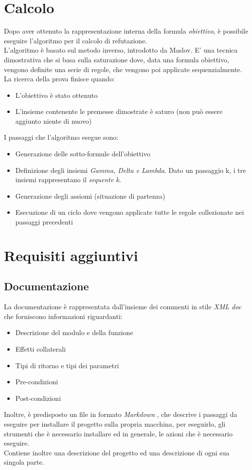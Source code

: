 \documentclass[\main/tesi.tex]{subfiles}
\begin{document}
\section{Calcolo}
Dopo aver ottenuto la rappresentazione interna della formula \textit{obiettivo}, è possibile eseguire l'algoritmo per il calcolo di refutazione. \\
L'algoritmo è basato sul metodo inverso, introdotto da Maslov. E' una tecnica dimostrativa che si basa sulla saturazione dove, data una formula obiettivo, vengono definite una serie di regole, che vengono poi applicate sequenzialmente. \\
La ricerca della prova finisce quando:
\begin{itemize}
    \item L'obiettivo è stato ottenuto
    \item L'insieme contenente le premesse dimostrate è saturo (non può essere aggiunto niente di nuovo)
\end{itemize}
I passaggi che l'algoritmo esegue sono:
\begin{itemize}
    \item Generazione delle sotto-formule dell'obiettivo
    \item Definizione degli insiemi \textit{Gamma, Delta e Lambda}. Dato un passaggio k, i tre insiemi rappresentano il \textit{sequente k}.
    \item Generazione degli assiomi (situazione di partenza)
    \item Esecuzione di un ciclo dove vengono applicate tutte le regole collezionate nei passaggi precedenti
\end{itemize}

\section{Requisiti aggiuntivi}

\subsection{Documentazione}
\label{documentation}
La documentazione è rappresentata dall'insieme dei commenti in stile \textit{XML doc} \cite{xml} che forniscono informazioni riguardanti:
\begin{itemize}
    \item Descrizione del modulo e della funzione
    \item Effetti collaterali
    \item Tipi di ritorno e tipi dei parametri
    \item Pre-condizioni
    \item Post-condizioni
\end{itemize}
Inoltre, è predisposto un file in formato \textit{Markdown} \cite{markdown}, che descrive i passaggi da eseguire per installare il progetto sulla propria macchina, per eseguirlo, gli strumenti che è necessario installare ed in generale, le azioni che è necessario eseguire. \\
Contiene inoltre una descrizione del progetto ed una descrizione di ogni sua singola parte. \\
\end{document}
